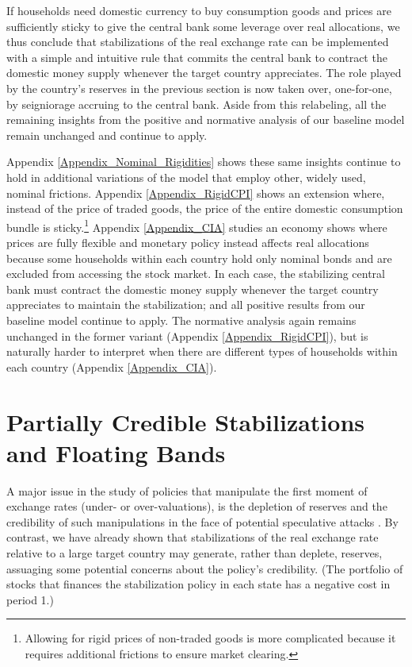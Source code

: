 \documentclass[12pt,letter]{article}
\theoremstyle{break} \theorembodyfont{\normalfont\itshape}
\theoremstyle{break}
\theoremstyle{break} \theorembodyfont{\normalfont\itshape}
\theoremstyle{break} \theorembodyfont{\normalfont\itshape}
\begin{document}
If households need domestic currency to buy consumption goods and
prices are sufficiently sticky to give the central bank some leverage
over real allocations, we thus conclude that stabilizations of the
real exchange rate can be implemented with a simple and intuitive rule
that commits the central bank to contract the domestic money supply
whenever the target country appreciates. The role played by the
country's reserves in the previous section is now taken over,
one-for-one, by seigniorage accruing to the central bank. Aside from
this relabeling, all the remaining insights from the positive and
normative analysis of our baseline model remain unchanged and continue
to apply.

Appendix \ref{Appendix_Nominal_Rigidities} shows these same insights continue to hold in additional variations of the model that
employ other, widely used, nominal frictions. Appendix \ref{Appendix_RigidCPI}
shows an extension where, instead of the price of traded goods, the
price of the entire domestic consumption bundle is
sticky.\footnote{Allowing for rigid prices of non-traded goods is more
  complicated because it requires additional frictions to ensure
  market clearing.} Appendix \ref{Appendix_CIA} studies an economy
shows where prices are fully flexible and monetary policy instead
affects real allocations because some households within each country
hold only nominal bonds and are excluded from accessing the stock
market. In each case, the stabilizing central bank must contract the
domestic money supply whenever the target country appreciates to
maintain the stabilization; and all positive results from our baseline
model continue to apply. The normative analysis again remains
unchanged in the former variant (Appendix \ref{Appendix_RigidCPI}),
but is naturally harder to interpret when there are different types of
households within each country (Appendix \ref{Appendix_CIA}).



\section{Partially Credible Stabilizations and Floating
  Bands\label{sec:credible}}

A major issue in the study of policies that manipulate the first
moment of exchange rates (under- or over-valuations), is the depletion
of reserves and the credibility of such manipulations in the face of
potential speculative attacks \citep{Krugman1979, Garber1995}. By
contrast, we have already shown that stabilizations of the real
exchange rate relative to a large target country may generate, rather
than deplete, reserves, assuaging some potential concerns about the
policy's credibility. (The portfolio of stocks that finances the
stabilization policy in each state has a negative cost in period 1.)
\end{document}
